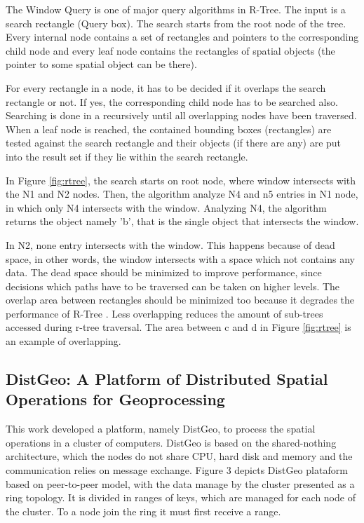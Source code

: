 The Window Query is one of major query algorithms in R-Tree. The input is a search rectangle (Query box). The search starts from the root node of the tree. Every internal node contains a set of rectangles and pointers to the corresponding child node and every leaf node contains the rectangles of spatial objects (the pointer to some spatial object can be there). 

For every rectangle in a node, it has to be decided if it overlaps the search rectangle or not. If yes, the corresponding child node has to be searched also. Searching is done in a recursively until all overlapping nodes have been traversed. When a leaf node is reached, the contained bounding boxes (rectangles) are tested against the search rectangle and their objects (if there are any) are put into the result set if they lie within the search rectangle.

	In Figure \ref{fig:rtree}, the search starts on root node, where window intersects with the N1 and N2 nodes. Then, the algorithm analyze N4 and n5 entries in N1 node, in which only N4 intersects with the window. Analyzing N4, the algorithm returns the object namely 'b', that is the single object that intersects the window.
	
	In N2, none entry intersects with the window. This happens because of dead space, in other words, the window intersects with a space which not contains any data. The dead space should be minimized to improve performance, since decisions which paths have to be traversed can be taken on higher levels. The overlap area between rectangles should be minimized too because it degrades the performance of R-Tree \cite{beckmann1990r}. Less overlapping reduces the amount of sub-trees accessed during r-tree traversal. The area between c and d in Figure \ref{fig:rtree} is an example of overlapping.

\subsection{DistGeo: A Platform of Distributed Spatial Operations for Geoprocessing}

This work developed a platform, namely DistGeo, to process the spatial operations in a cluster of computers. DistGeo is based on the shared-nothing architecture, which the nodes do not share CPU, hard disk and memory and the communication relies on message exchange. Figure 3 depicts DistGeo plataform based on peer-to-peer model, with the data manage by the cluster presented as a ring topology. It is divided in ranges of keys, which are managed for each node of the cluster. To a node join the ring it must first receive a range.

